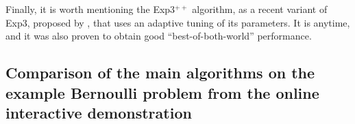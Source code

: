 %



Finally, it is worth mentioning the Exp3$^{++}$ algorithm, as a recent variant of Exp3, proposed by \cite{Seldin17},
that uses an adaptive tuning of its parameters.
It is anytime, and it was also proven to obtain good ``best-of-both-world'' performance.


\subsection{Comparison of the main algorithms on the example Bernoulli problem from the online interactive demonstration}
\label{sub:2:shortNumericalExperiments}

